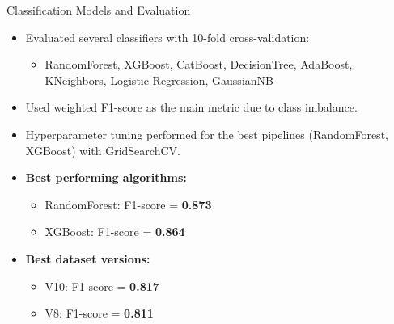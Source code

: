 \documentclass{beamer}
\begin{document}
\begin{frame}{Classification Models and Evaluation}
    \begin{itemize}
        \item Evaluated several classifiers with 10-fold cross-validation:
        \begin{itemize}
            \item RandomForest, XGBoost, CatBoost, DecisionTree, AdaBoost,
                    KNeighbors, Logistic Regression, GaussianNB
        \end{itemize}
        \item Used weighted F1-score as the main metric due to class imbalance.
        \item Hyperparameter tuning performed for the best pipelines
                (RandomForest, XGBoost) with GridSearchCV.
        \item \textbf{Best performing algorithms:}
        \begin{itemize}
            \item RandomForest: F1-score = \textbf{0.873}
            \item XGBoost: F1-score = \textbf{0.864}
        \end{itemize}
        \item \textbf{Best dataset versions:}
        \begin{itemize}
            \item V10: F1-score = \textbf{0.817}
            \item V8: F1-score = \textbf{0.811}
        \end{itemize}
    \end{itemize}
\end{frame}
\end{document}
